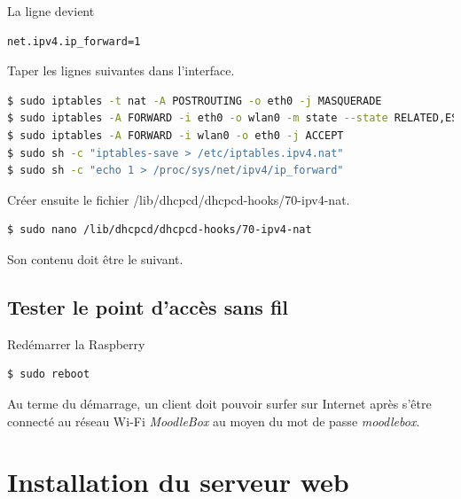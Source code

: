 \documentclass[11pt]{article}
\begin{document}
La ligne devient
\begin{lstlisting}[language=bash]
net.ipv4.ip_forward=1
\end{lstlisting}

Taper les lignes suivantes dans l'interface.

\begin{lstlisting}[language=bash]
$ sudo iptables -t nat -A POSTROUTING -o eth0 -j MASQUERADE
$ sudo iptables -A FORWARD -i eth0 -o wlan0 -m state --state RELATED,ESTABLISHED -j ACCEPT
$ sudo iptables -A FORWARD -i wlan0 -o eth0 -j ACCEPT
$ sudo sh -c "iptables-save > /etc/iptables.ipv4.nat"
$ sudo sh -c "echo 1 > /proc/sys/net/ipv4/ip_forward"
\end{lstlisting}

Créer ensuite le fichier {/lib/dhcpcd/dhcpcd-hooks/70-ipv4-nat}.
\begin{lstlisting}[language=bash]
$ sudo nano /lib/dhcpcd/dhcpcd-hooks/70-ipv4-nat
\end{lstlisting}

Son contenu doit être le suivant.



\subsection{Tester le point d'accès sans fil}

Redémarrer la Raspberry

\begin{lstlisting}[language=bash]
$ sudo reboot
\end{lstlisting}

\begin{verification}
Au terme du démarrage, un client doit pouvoir surfer sur Internet après s'être connecté au réseau Wi-Fi \emph{MoodleBox} au moyen du mot de passe \emph{moodlebox}.
\end{verification}

\section{Installation du serveur web}
\end{document}
